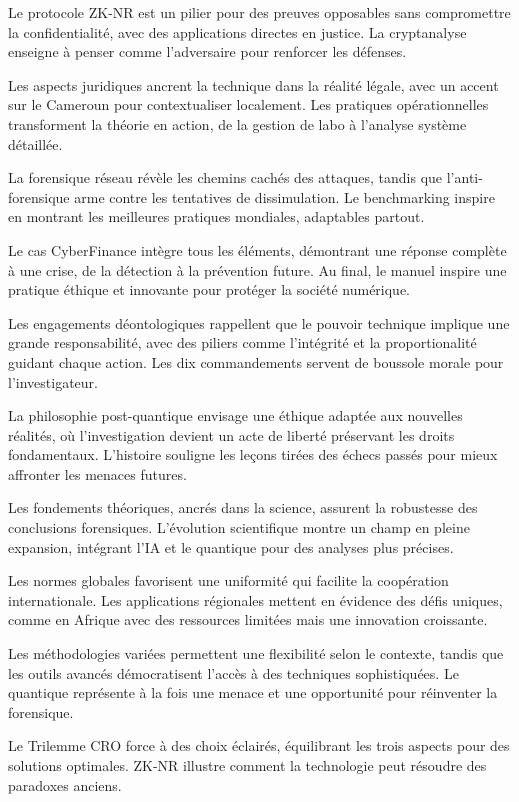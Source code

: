 \documentclass[a4paper,12pt]{extarticle}
\begin{document}
Le protocole ZK-NR est un pilier pour des preuves opposables sans compromettre la confidentialité, avec des applications directes en justice. La cryptanalyse enseigne à penser comme l'adversaire pour renforcer les défenses.

Les aspects juridiques ancrent la technique dans la réalité légale, avec un accent sur le Cameroun pour contextualiser localement. Les pratiques opérationnelles transforment la théorie en action, de la gestion de labo à l'analyse système détaillée.

La forensique réseau révèle les chemins cachés des attaques, tandis que l'anti-forensique arme contre les tentatives de dissimulation. Le benchmarking inspire en montrant les meilleures pratiques mondiales, adaptables partout.

Le cas CyberFinance intègre tous les éléments, démontrant une réponse complète à une crise, de la détection à la prévention future. Au final, le manuel inspire une pratique éthique et innovante pour protéger la société numérique.

Les engagements déontologiques rappellent que le pouvoir technique implique une grande responsabilité, avec des piliers comme l'intégrité et la proportionalité guidant chaque action. Les dix commandements servent de boussole morale pour l'investigateur.

La philosophie post-quantique envisage une éthique adaptée aux nouvelles réalités, où l'investigation devient un acte de liberté préservant les droits fondamentaux. L'histoire souligne les leçons tirées des échecs passés pour mieux affronter les menaces futures.

Les fondements théoriques, ancrés dans la science, assurent la robustesse des conclusions forensiques. L'évolution scientifique montre un champ en pleine expansion, intégrant l'IA et le quantique pour des analyses plus précises.

Les normes globales favorisent une uniformité qui facilite la coopération internationale. Les applications régionales mettent en évidence des défis uniques, comme en Afrique avec des ressources limitées mais une innovation croissante.

Les méthodologies variées permettent une flexibilité selon le contexte, tandis que les outils avancés démocratisent l'accès à des techniques sophistiquées. Le quantique représente à la fois une menace et une opportunité pour réinventer la forensique.

Le Trilemme CRO force à des choix éclairés, équilibrant les trois aspects pour des solutions optimales. ZK-NR illustre comment la technologie peut résoudre des paradoxes anciens.
\end{document}
